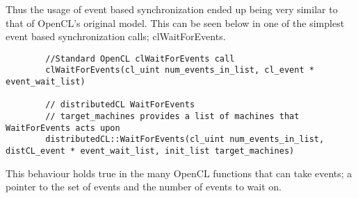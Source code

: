 \documentclass[report.tex]{subfiles}
\begin{document}
        Thus the usage of event based synchronization ended up being very similar to that of OpenCL's original model. This can be seen below in one of the simplest event based synchronization calls; clWaitForEvents.

        \begin{lstlisting}
        //Standard OpenCL clWaitForEvents call
        clWaitForEvents(cl_uint num_events_in_list, cl_event * event_wait_list)
        
        // distributedCL WaitForEvents
        // target_machines provides a list of machines that WaitForEvents acts upon
        distributedCL::WaitForEvents(cl_uint num_events_in_list, distCL_event * event_wait_list, init_list target_machines)
        \end{lstlisting}

        This behaviour holds true in the many OpenCL functions that can take events; a pointer to the set of events and the number of events to wait on.


\end{document}
